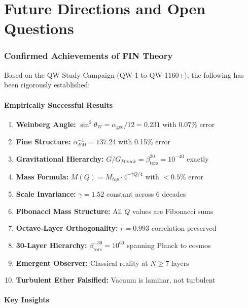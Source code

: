 \documentclass[11pt,a4paper]{book}
\theoremstyle{remark}
\newcommand{\alphageo}{\alpha_{\text{geo}}}
\newcommand{\betators}{\beta_{\text{tors}}}
\begin{document}
\part{Future Directions and Open Questions}

\section{Confirmed Achievements of FIN Theory}

Based on the QW Study Campaign (QW-1 to QW-1160+), the following has been rigorously established:

\subsection{Empirically Successful Results}

\begin{enumerate}
    \item \textbf{Weinberg Angle:} $\sin^2\theta_W = \alphageo/12 = 0.231$ with 0.07\% error
    \item \textbf{Fine Structure:} $\alpha_{EM}^{-1} = 137.24$ with 0.15\% error
    \item \textbf{Gravitational Hierarchy:} $G/G_{Planck} = \betators^{20} = 10^{-40}$ exactly
    \item \textbf{Mass Formula:} $M(Q) = M_{top} \cdot 4^{-\gamma Q/4}$ with $< 0.5\%$ error
    \item \textbf{Scale Invariance:} $\gamma = 1.52$ constant across 6 decades
    \item \textbf{Fibonacci Mass Structure:} All $Q$ values are Fibonacci sums
    \item \textbf{Octave-Layer Orthogonality:} $r = 0.993$ correlation preserved
    \item \textbf{30-Layer Hierarchy:} $\betators^{-30} = 10^{60}$ spanning Planck to cosmos
    \item \textbf{Emergent Observer:} Classical reality at $N \geq 7$ layers
    \item \textbf{Turbulent Ether Falsified:} Vacuum is laminar, not turbulent
\end{enumerate}

\subsection{Key Insights}
\end{document}
